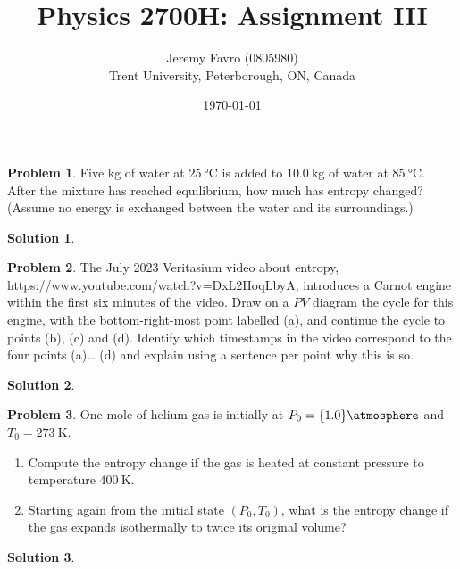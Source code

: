 \documentclass[10pt]{article}
\title{Physics 2700H: Assignment III}
\author{Jeremy Favro (0805980) \\ Trent University, Peterborough, ON, Canada}
\date{\today}
\theoremstyle{definition}
\newtheorem{problem}{Problem}
\newtheorem{soln}{Solution}
\begin{document}
\maketitle

\begin{problem}
Five kg of water at $\qty{25}{\degreeCelsius}$ is added to $\qty{10.0}{\kilo\gram}$ of water at $\qty{85}{\degreeCelsius}$.
After the mixture has reached equilibrium, how much has entropy changed?
(Assume no energy is exchanged between the water and its surroundings.)
\end{problem}
\begin{soln}
  
\end{soln}

\begin{problem}
The July 2023 Veritasium video about entropy, https://www.youtube.com/watch?v=DxL2HoqLbyA,
introduces a Carnot engine within the first six minutes of the video. Draw on a $PV$ diagram the cycle for
this engine, with the bottom-right-most point labelled (a), and continue the cycle to points (b), (c) and
(d). Identify which timestamps in the video correspond to the four points (a)… (d) and explain using a
sentence per point why this is so.
\end{problem}
\begin{soln}

\end{soln}

\begin{problem}
One mole of helium gas is initially at $P_0=\qty{1.0}{\atmosphere}$ and $T_0=\qty{273}{\kelvin}$.
\begin{enumerate}[label=(\alph*)]
  \item Compute the entropy change if the gas is heated at constant pressure to temperature $\qty{400}{\kelvin}$.
  \item Starting again from the initial state $(P_0, T_0)$, what is the entropy change if
        the gas expands isothermally to twice its original volume?
\end{enumerate}
\end{problem}
\begin{soln}

\end{soln}
\end{document}
